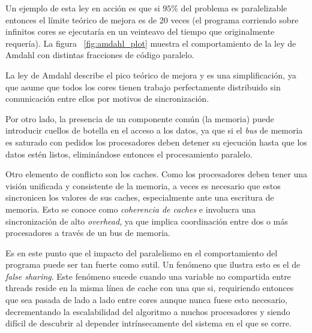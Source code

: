 Un ejemplo de esta ley en acci\'on es que si $95 \%$ del problema es paralelizable entonces el l\'imite te\'orico de
mejora es de 20 veces (el programa corriendo sobre infinitos cores se ejecutar\'ia en un veinteavo del tiempo que originalmente
requer\'ia). La figura ~\ref{fig:amdahl_plot} muestra el comportamiento de la ley de Amdahl con distintas fracciones de c\'odigo
paralelo.

La ley de Amdahl describe el pico te\'orico de mejora y es una simplificaci\'on, ya que asume que todos los cores tienen
trabajo perfectamente distribuido sin comunicaci\'on entre ellos por motivos de sincronizaci\'on.

Por otro lado, la presencia de un componente com\'un (la memoria) puede introducir cuellos de botella en el acceso a los
datos, ya que si el \textit{bus} de memoria es saturado con pedidos los procesadores deben detener su ejecuci\'on hasta que
los datos est\'en listos, elimin\'andose entonces el procesamiento paralelo.

Otro elemento de conflicto son los caches. Como los procesadores deben tener una visi\'on unificada y consistente de la
memoria, a veces es necesario que estos sincronicen los valores de sus caches, especialmente ante una escritura de memoria.
Esto se conoce como \textit{coherencia de caches} e involucra una sincronizaci\'on de alto \textit{overhead}, ya
que implica coordinaci\'on entre dos o m\'as procesadores a trav\'es de un bus de memoria.

Es en este punto que el impacto del paralelismo en el comportamiento del programa puede ser tan fuerte como sutil. Un fen\'omeno que
ilustra esto es el de \textit{false sharing}. Este fen\'omeno sucede cuando una variable no compartida entre threads
reside en la misma l\'inea de cache con una que si, requiriendo entonces que sea pasada de lado a lado entre cores aunque
nunca fuese esto necesario, decrementando la escalabilidad del algoritmo a muchos procesadores y siendo
dif\'icil de descubrir al depender intr\'insecamente del sistema en el que se corre.
